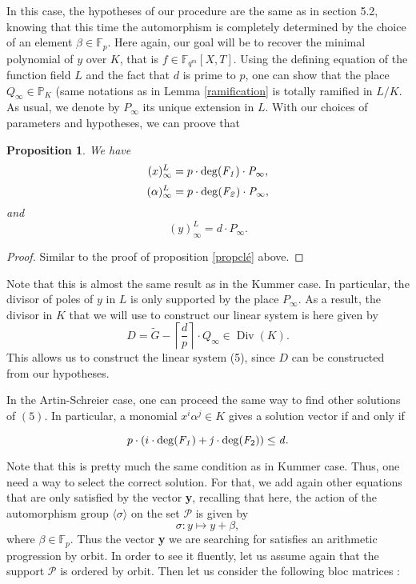 \documentclass[10pt]{article}
\newtheorem{prop1}[thm]{Proposition}
\newcommand{\s}{\vspace{0.3cm}}
\newcommand{\cd}{\cdot}
\newcommand{\PP}{\mathbb{P}}
\newcommand{\fqm}{\mathbb{F}_{q^m}}
\newcommand{\PR}{\mathcal{P}}
\newcommand{\Div}{\operatorname{Div}}
\begin{document}
\s

In this case, the hypotheses of our procedure are the same as in section 5.2, knowing that this time the automorphism is completely determined by the choice of an element $\beta \in \mathbb{F}_p$. Here again, our goal will be to recover the minimal polynomial of $y$ over $K$, that is $f \in \fqm[X,T]$. Using the defining equation of the function field $L$ and the fact that $d$ is prime to $p$, one can show that the place $Q_{\infty} \in \PP_K$ (same notations as in Lemma \ref{ramification} is totally ramified in $L/K$. As usual, we denote by $P_{\infty}$ its unique extension in $L$. With our choices of parameters and hypotheses, we can proove that

\s

\begin{prop1} \label{propclé2}
We have
\[(x)^L_{\infty} = p \cd \rm{deg}\it(F_1) \cd P_{\infty},\]
\[(\alpha)^L_{\infty} = p \cd \rm{deg}\it(F_2) \cd P_{\infty},\]
and
\[(y)^L_{\infty} = d \cd P_{\infty}.\]
\end{prop1}

\s

\begin{proof}
Similar to the proof of proposition \ref{propclé} above.
\end{proof}

\s

Note that this is almost the same result as in the Kummer case. In particular, the divisor of poles of $y$ in $L$ is only supported by the place $P_{\infty}$. As a result, the divisor in $K$ that we will use to construct our linear system is here given by 
\[D = \tilde{G} - \left\lceil\frac{d}{p}\right\rceil \cd Q_{\infty} \in \Div(K).\]
This allows us to construct the linear system (5), since $D$ can be constructed from our hypotheses. 

\s

In the Artin-Schreier case, one can proceed the same way to find other solutions of $(5)$. In particular, a monomial $x^i\alpha^j \in K$ gives a solution vector if and only if 

\[p \cd (i \cd \rm{deg}\it(F_1)+j \cd \rm{deg}\it(F_{\rm 2})) \leq d.\]

Note that this is pretty much the same condition as in Kummer case. Thus, one need a way to select the correct solution. For that, we add again other equations that are only satisfied by the vector \textbf{y}, recalling that here, the action of the automorphism group $\langle\sigma\rangle$ on the set $\PR$ is given by 
\[\sigma : y \longmapsto y + \beta,\]
where $\beta \in \mathbb{F}_p$. Thus the vector \textbf{y} we are searching for satisfies an arithmetic progression by orbit. In order to see it fluently, let us assume again that the support $\PR$ is ordered by orbit. Then let us consider the following bloc matrices :
\end{document}
